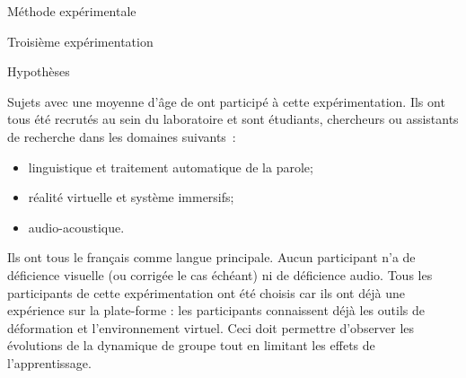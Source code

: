 \documentclass[myfrancais]{mythesis}
\begin{document}
\begin{mychapter}{Méthode expérimentale}
\begin{mysection}{Troisième expérimentation}
\begin{mysubsection}{Hypothèses}
			\end{mysubsection}
			\begin{mysubsection}{Sujets}
				 avec une moyenne d'âge de  ont participé à cette expérimentation.
				Ils ont tous été recrutés au sein du laboratoire  et sont étudiants, chercheurs ou assistants de recherche dans les domaines suivants~:
				\begin{itemize}
					\item linguistique et traitement automatique de la parole;
					\item réalité virtuelle et système immersifs;
					\item audio-acoustique.
				\end{itemize}
				Ils ont tous le français comme langue principale.
				Aucun participant n'a de déficience visuelle (ou corrigée le cas échéant) ni de déficience audio.
				Tous les participants de cette expérimentation ont été choisis car ils ont déjà une expérience sur la plate-forme : les participants connaissent déjà les outils de déformation et l'environnement virtuel.
				Ceci doit permettre d'observer les évolutions de la dynamique de groupe tout en limitant les effets de l'apprentissage.


\end{mysubsection}
\end{mysection}
\end{mychapter}
\end{document}
